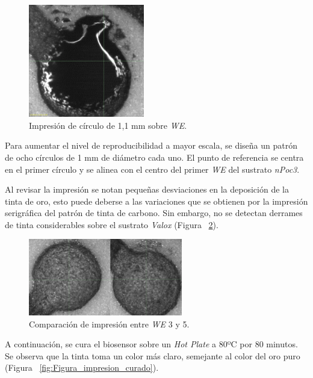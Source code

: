 \begin{figure}[H]
  \centering
    \includegraphics[width=0.45\textwidth]{Figuras/Figura_Segunda_Impresion_circulo}
  \caption{Impresión de círculo de 1,1 mm sobre \emph{WE}.}
  \label{fig:Figura_Segunda_Impresion_circulo}
\end{figure}

Para aumentar el nivel de reproducibilidad a mayor escala, se diseña un patrón de ocho círculos de 1 mm de diámetro cada uno. El punto de referencia se centra en el primer círculo y se alinea con el centro del primer \emph{WE} del sustrato \textit{nPoc3}.

Al revisar la impresión se notan pequeñas desviaciones en la deposición de la tinta de oro, esto puede deberse a las variaciones que se obtienen por la impresión serigráfica del patrón de tinta de carbono. Sin embargo, no se detectan derrames de tinta considerables sobre el sustrato \textit{Valox} (Figura ~\ref{fig:Figura_impresion_8juntos}).

\begin{figure}[H]
  \centering
    \includegraphics[width=0.6\textwidth]{Figuras/Figura_impresion_8juntos}
  \caption{Comparación de impresión entre \emph{WE} 3 y 5.}
  \label{fig:Figura_impresion_8juntos}
\end{figure}

A continuación, se cura el biosensor sobre un \textit{Hot Plate} a 80ºC por 80 minutos. Se observa que la tinta toma un color más claro, semejante al color del oro puro (Figura ~\ref{fig:Figura_impresion_curado}).

